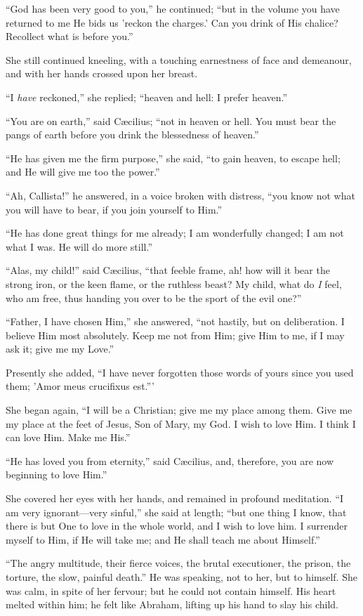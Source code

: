 ``God has been very good to you,'' he continued; ``but
in the volume you have returned to me He bids us 'reckon the charges.'
Can you drink of His chalice? Recollect what is before you.''

She still continued kneeling, with a touching earnestness of
face and demeanour, and with her hands crossed upon her breast.

``I \emph{have} reckoned,'' she replied; ``heaven and
hell: I prefer heaven.''

``You are on earth,'' said Cæcilius; ``not in heaven
or hell. You must bear the pangs of earth before you drink the
blessedness of heaven.''

``He has given me the firm purpose,'' she said, ``to
gain heaven, to escape hell; and He will give me too the power.''

``Ah, Callista!'' he answered, in a voice broken with
distress, ``you know not what you will have to bear, if you join
yourself to Him.''

``He has done great things for me already; I am wonderfully
changed; I am not what I was. He will do more still.''

``Alas, my child!'' said Cæcilius, ``that feeble
frame, ah! how will it bear the strong iron, or the keen flame, or the
ruthless beast? My child, what do \emph{I} feel, who am free, thus
handing you over to be the sport of the evil one?''

``Father, I have chosen Him,'' she answered, ``not
hastily, but on deliberation. I believe Him most absolutely. Keep me
not from Him; give Him to me, if I may ask it; give me my Love.''

Presently she added, ``I have never forgotten those words of
yours since you used them; 'Amor meus crucifixus est.'''

She began again, ``I will be a Christian; give me my place
among them. Give me my place at the feet of Jesus, Son of Mary,
my God. I wish to love Him. I think I can love Him. Make me His.''

``He has loved you from eternity,'' said Cæcilius, and,
therefore, you are now beginning to love Him.''

She covered her eyes with her hands, and remained in profound
meditation. ``I am very ignorant—very sinful,'' she said at
length; ``but one thing I know, that there is but One to love in
the whole world, and I wish to love him. I surrender myself to Him, if
He will take me; and He shall teach me about Himself.''

``The angry multitude, their fierce voices, the brutal
executioner, the prison, the torture, the slow, painful death.''
He was speaking, not to her, but to himself. She was calm, in spite of
her fervour; but he could not contain himself. His heart melted within
him; he felt like Abraham, lifting up his hand to slay his child.

